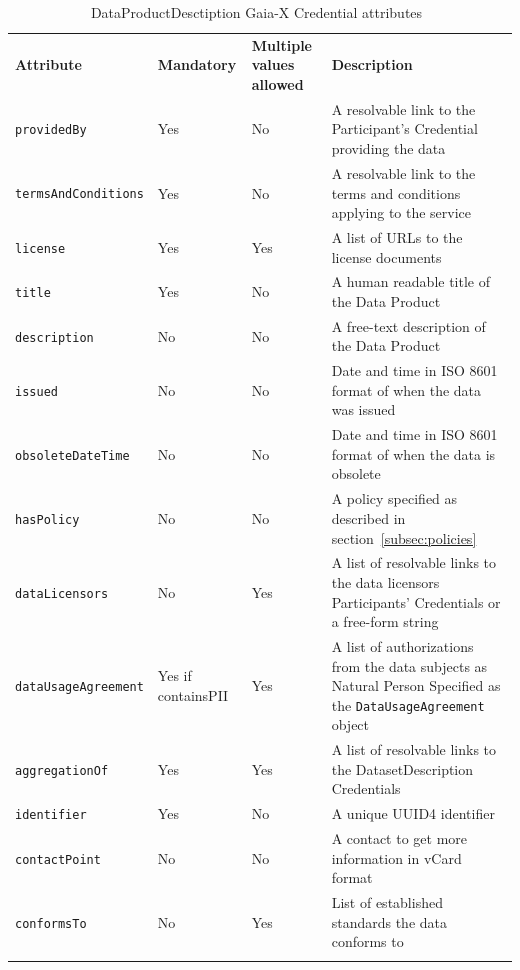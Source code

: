 \begin{longtable}{ |p{4cm}|p{2cm}|p{2cm}|p{7cm}| }
    \hhline{----}
    \textbf{Attribute} & \textbf{Mandatory} & \textbf{Multiple values allowed} & \textbf{Description}\\
    \hhline{----}
    \texttt{providedBy} & Yes & No & A resolvable link to the Participant's Credential providing the data\\
    \hhline{----}
    \texttt{termsAndConditions} & Yes & No & A resolvable link to the terms and conditions applying to the service\\
    \hhline{----}
    \texttt{license} & Yes & Yes & A list of URLs to the license documents\\
    \hhline{----}
    \texttt{title} & Yes & No & A human readable title of the Data Product\\
    \hhline{----}
    \texttt{description} & No & No & A free-text description of the Data Product\\
    \hhline{----}
    \texttt{issued} & No & No & Date and time in ISO 8601 format of when the data was issued\\
    \hhline{----}
    \texttt{obsoleteDateTime} & No & No & Date and time in ISO 8601 format of when the data is obsolete\\
    \hhline{----}
    \texttt{hasPolicy} & No & No & A policy specified as described in section~\ref{subsec:policies}\\
    \hhline{----}
    \texttt{dataLicensors} & No & Yes & A list of resolvable links to the data licensors Participants' Credentials or a free-form string\\
    \hhline{----}
    \texttt{dataUsageAgreement} & Yes if containsPII & Yes & A list of authorizations from the data subjects as Natural Person
    Specified as the \texttt{DataUsageAgreement} object\\
    \hhline{----}
    \texttt{aggregationOf} & Yes & Yes & A list of resolvable links to the DatasetDescription Credentials\\
    \hhline{----}
    \texttt{identifier} & Yes & No & A unique UUID4 identifier\\
    \hhline{----}
    \texttt{contactPoint} & No & No & A contact to get more information in vCard format\\
    \hhline{----}
    \texttt{conformsTo} & No & Yes & List of established standards the data conforms to\\
    \hhline{----}
    \caption{DataProductDesctiption Gaia-X Credential attributes~\cite{gaiax_data_exchange_document}}
    \label{tab:data_product_description}
\end{longtable}

